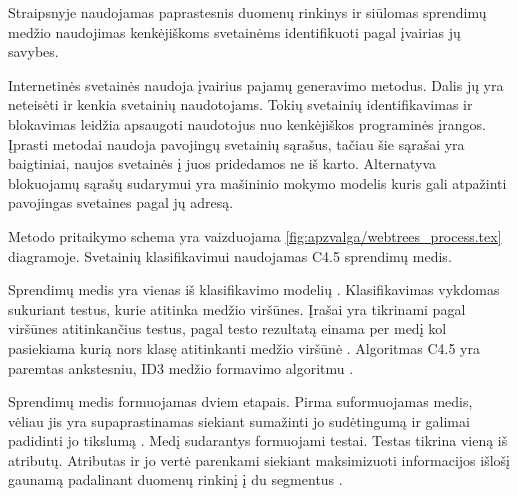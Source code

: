 Straipsnyje  naudojamas paprastesnis duomenų rinkinys ir siūlomas sprendimų medžio naudojimas kenkėjiškoms svetainėms identifikuoti pagal įvairias jų savybes.

Internetinės svetainės naudoja įvairius pajamų generavimo metodus. Dalis jų yra neteisėti ir kenkia svetainių naudotojams. Tokių svetainių identifikavimas ir blokavimas leidžia apsaugoti naudotojus nuo kenkėjiškos programinės įrangos. Įprasti metodai naudoja pavojingų svetainių sąrašus, tačiau šie sąrašai yra baigtiniai, naujos svetainės į juos pridedamos ne iš karto\cite{webtrees}. Alternatyva blokuojamų sąrašų sudarymui yra mašininio mokymo modelis kuris gali atpažinti pavojingas svetaines pagal jų adresą.


Metodo pritaikymo schema yra vaizduojama \vref{fig:apzvalga/webtrees_process.tex} diagramoje. Svetainių klasifikavimui naudojamas C4.5 sprendimų medis.


Sprendimų medis yra vienas iš klasifikavimo modelių \cite{c45}. Klasifikavimas vykdomas sukuriant testus, kurie atitinka medžio viršūnes. Įrašai yra tikrinami pagal viršūnes atitinkančius testus, pagal testo rezultatą einama per medį kol pasiekiama kurią nors klasę atitinkanti medžio viršūnė \cite{trees}. Algoritmas C4.5 yra paremtas ankstesniu, ID3 medžio formavimo algoritmu \cite{c45}.

Sprendimų medis formuojamas dviem etapais. Pirma suformuojamas medis, vėliau jis yra supaprastinamas siekiant sumažinti jo sudėtingumą ir galimai padidinti jo tikslumą \cite{c45}. Medį sudarantys formuojami testai. Testas tikrina vieną iš atributų. Atributas ir jo vertė parenkami siekiant maksimizuoti informacijos išlošį gaunamą padalinant duomenų rinkinį į du segmentus \cite{Wu2008}.

